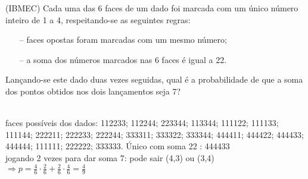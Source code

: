 \begin{ex}
(IBMEC) Cada uma das 6 faces de um dado foi marcada com um único número inteiro de 1 a 4, respeitando-se as seguintes regras:
   \begin{itemize}
   \item [--]  faces opostas foram marcadas com um mesmo número;
   \item [--] a soma dos números marcados nas 6 faces é igual a 22.
   \end{itemize}
Lançando-se este dado duas vezes seguidas, qual é a probabilidade de que a soma dos pontos obtidos nos dois lançamentos seja 7?
 \begin{sol}
   \phantom{A} \\
   faces possíveis dos dados: 112233; 112244; 223344; 113344; 111122; 111133; 111144; 222211; 222233; 222244; 333311; 333322; 333344; 444411; 444422; 444433; 444444; 111111; 222222; 333333.
   Único com soma 22 : 444433 \\
   jogando 2 vezes para dar soma 7: pode sair (4,3) ou (3,4) \\
   $\Longrightarrow p =\frac{4}{6}\cdot\frac{2}{6}+\frac{2}{6}\cdot\frac{4}{6}=\frac{4}{9}$
 \end{sol}
\end{ex}